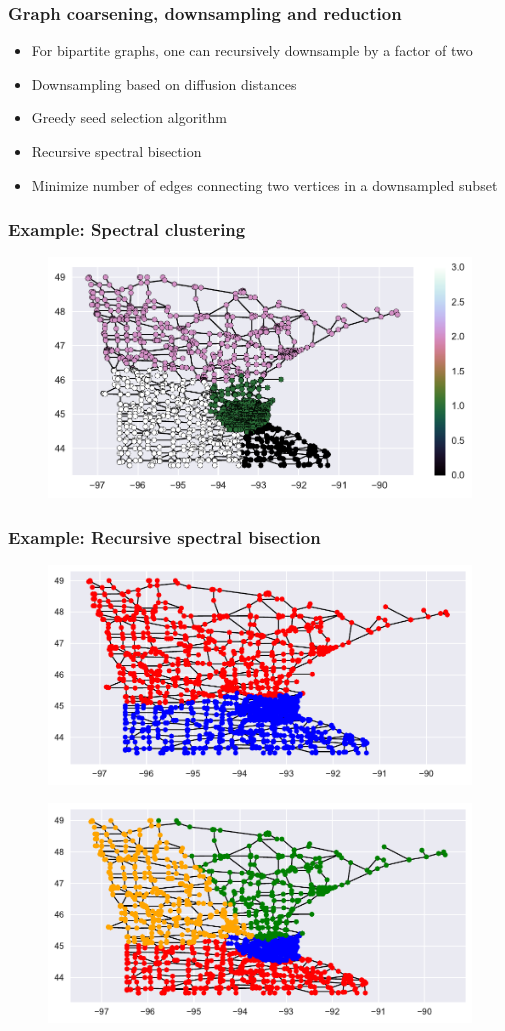 \documentclass{beamer}
\begin{document}
\begin{frame}
  \frametitle{Graph coarsening, downsampling and reduction}

  \begin{itemize}
  \item For bipartite graphs, one can recursively downsample by a factor of two
  \item Downsampling based on diffusion distances
  \item Greedy seed selection algorithm
  \item Recursive spectral bisection
  \item Minimize number of edges connecting two vertices in a downsampled subset
  \end{itemize}
\end{frame}

\begin{frame}
  \frametitle{Example: Spectral clustering}
\begin{figure}
\includegraphics[trim={1cm 0.7cm 2cm 0},clip,width=0.9\linewidth]{../img/clustering_methods_1.pdf}
\end{figure}
\end{frame}

\begin{frame}
  \frametitle{Example: Recursive spectral bisection}
\begin{figure}
\includegraphics[trim={1cm 0.7cm 0 0},clip,width=0.5\linewidth]{../img/clustering_methods_2.pdf}
\end{figure}
\begin{figure}
\includegraphics[trim={1cm 0.7cm 0 0},clip,width=0.5\linewidth]{../img/clustering_methods_3.pdf}
\end{figure}
\end{frame}
\end{document}
